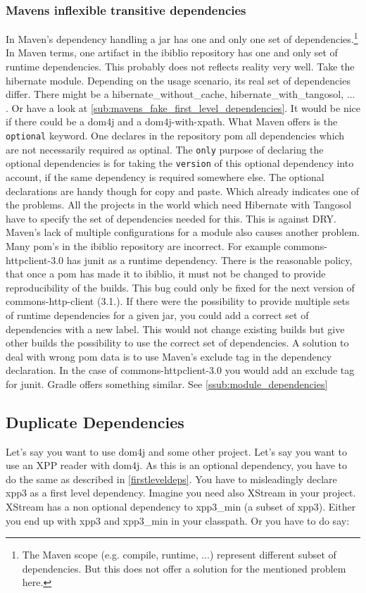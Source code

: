 \subsubsection{Mavens inflexible transitive dependencies}
In Maven’s dependency handling a jar has one and only one set of dependencies.\footnote{The Maven scope (e.g. compile, runtime, ...) represent different subset of dependencies. But this does not offer a solution for the mentioned problem here.} In Maven terms, one artifact in the ibiblio repository has one and only set of runtime dependencies. This probably does not reflects reality very well. Take the hibernate module. Depending on the usage scenario, its real set of dependencies differ. There might be a hibernate\_without\_cache, hibernate\_with\_tangosol, ... . Or have a look at \ref{sub:mavens_fake_first_level_dependencies}. It would be nice if there could be a dom4j and a dom4j-with-xpath. What Maven offers is the \texttt{optional} keyword. One declares in the repository pom all dependencies which are not necessarily required as optinal. The \texttt{only} purpose of declaring the optional dependencies is for taking the \texttt{version} of this optional dependency into account, if the same dependency is required somewhere else. The optional declarations are handy though for copy and paste. Which already indicates one of the problems. All the projects in the world which need Hibernate with Tangosol have to specify the set of dependencies needed for this. This is against DRY. 
Maven's lack of multiple configurations for a module also causes another problem. Many pom's in the ibiblio repository are incorrect. For example commons-httpclient-3.0 has junit as a runtime dependency. There is the reasonable policy, that once a pom has made it to ibiblio, it must not be changed to provide reproducibility of the builds. This bug could only be fixed for the next version of commons-http-client (3.1.). If there were the possibility to provide multiple sets of runtime dependencies for a given jar, you could add a correct set of dependencies with a new label. This would not change existing builds but give other builds the possibility to use the correct set of dependencies. A solution to deal with wrong pom data is to use Maven's exclude tag in the dependency declaration. In the case of commons-httpclient-3.0 you would add an exclude tag for junit. Gradle offers something similar. See \ref{ssub:module_dependencies}

\subsection{Duplicate Dependencies} %
\label{sub:duplicate_dependencies}
Let's say you want to use dom4j and some other project. Let's say you want to use an XPP reader with dom4j. As this is an optional dependency, you have to do the same as described in \ref{firstleveldeps}. You have to misleadingly declare xpp3 as a first level dependency. Imagine you need also XStream in your project. XStream has a non optional dependency to xpp3\_min (a subset of xpp3). Either you end up with xpp3 and xpp3\_min in your classpath. Or you have to do say:

